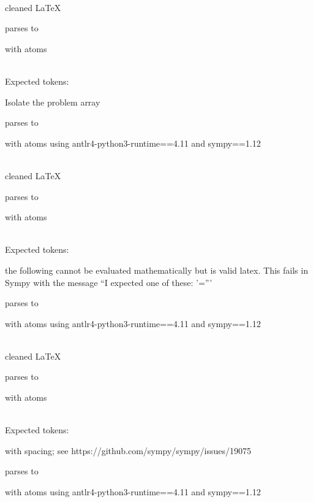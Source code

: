 \documentclass{article}
\begin{document}
\ \\
cleaned \LaTeX

parses to

with atoms


\ \\
Expected tokens:


\hrulefill

Isolate the problem array

parses to

with atoms
using antlr4-python3-runtime==4.11 and sympy==1.12

\ \\
cleaned \LaTeX

parses to

with atoms


\ \\
Expected tokens:



\hrulefill

the following cannot be evaluated mathematically but is valid latex. 
This fails in Sympy with the message ``I expected one of these: '='''

parses to

with atoms
using antlr4-python3-runtime==4.11 and sympy==1.12

\ \\
cleaned \LaTeX

parses to

with atoms


\ \\
Expected tokens:



\hrulefill

with spacing; see https://github.com/sympy/sympy/issues/19075

parses to

with atoms
using antlr4-python3-runtime==4.11 and sympy==1.12
\end{document}
